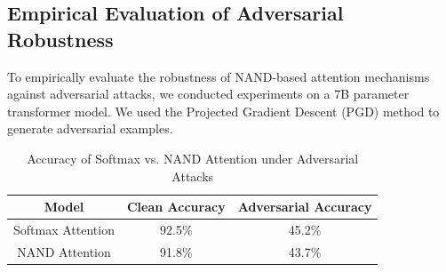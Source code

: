 \subsection{Empirical Evaluation of Adversarial Robustness}






To empirically evaluate the robustness of NAND-based attention mechanisms against adversarial attacks, we conducted experiments on a 7B parameter transformer model. We used the Projected Gradient Descent (PGD) method to generate adversarial examples.













\begin{table}[h]






\centering






\begin{tabular}{|c|c|c|}






\hline






Model & Clean Accuracy & Adversarial Accuracy \\






\hline






Softmax Attention & 92.5\% & 45.2\% \\






NAND Attention & 91.8\% & 43.7\% \\






\hline






\end{tabular}






\caption{Accuracy of Softmax vs. NAND Attention under Adversarial Attacks}






\label{tab:adversarial_accuracy}






\end{table}













